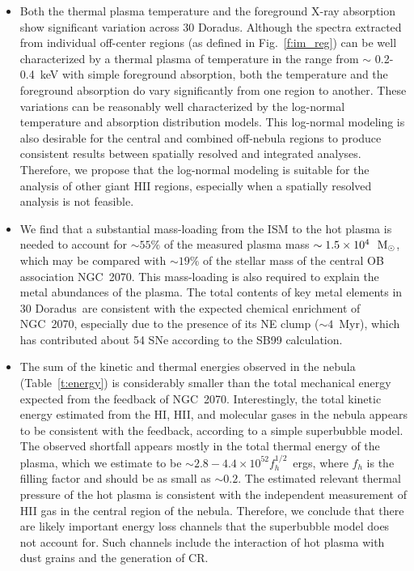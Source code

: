 \documentclass[usenatbib]{mnras}
\def\xs{30 Doradus}
\begin{document}
\begin{itemize}

\item Both the thermal plasma temperature and the foreground X-ray absorption show significant variation across \xs. Although the spectra extracted from individual off-center regions (as defined in Fig.~\ref{f:im_reg}) can be well characterized by a thermal plasma of temperature in the range from $\sim$ 0.2-0.4~keV with simple foreground absorption, both the temperature  and the foreground absorption do vary significantly from one region to another. These variations can be reasonably well characterized by the log-normal temperature and absorption distribution models. This log-normal modeling is also desirable for the central and combined off-nebula regions to produce consistent results between spatially resolved and integrated analyses. Therefore, we propose that the log-normal modeling is suitable for the analysis of other giant HII regions, especially when a spatially resolved analysis is not feasible. 

\item We find that a substantial mass-loading from the ISM to the hot plasma is needed to account for $\sim 55\%$ of the measured plasma mass $\sim 1.5 \times 10^4~{\rm~M_{\odot}}$, which may be compared with $\sim 19\%$ of the stellar mass of the central OB association NGC~2070. This mass-loading is also required to explain the metal abundances of the plasma. The total contents of key metal elements in \xs\ are consistent with the expected chemical enrichment of NGC~2070, especially due to the presence of its NE clump ($\sim4$~Myr), which has contributed about 54 SNe according to the SB99 calculation.

\item The sum of the kinetic and thermal energies observed in the nebula (Table~\ref{t:energy}) is considerably smaller than the total mechanical energy expected from the feedback of NGC~2070. Interestingly, the total kinetic energy estimated from the HI, HII, and molecular gases in the nebula appears to be consistent with the feedback, according to a simple superbubble model. The observed shortfall appears mostly in the total thermal energy of the plasma, which we estimate to be $\sim 2.8-4.4 \times10^{52}f_h^{1/2}$~ergs, where $f_h$ is the filling factor and should be as small as $\sim 0.2$. The estimated relevant thermal pressure of the hot plasma is consistent with the independent measurement of HII gas in the central region of the nebula. Therefore, we conclude that there are likely important energy loss channels that the superbubble model does not account for. Such channels include the interaction of hot plasma with dust grains and the generation of CR.


\end{itemize}
\end{document}
